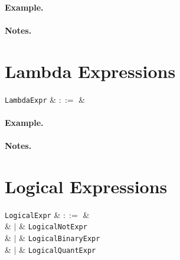 \paragraph{Example.}

\paragraph{Notes.}


\section{Lambda Expressions}
\label{c_expr_lambda}

\begin{syntax}
  \verb+LambdaExpr+ & $::=$ &\\
\end{syntax}

\paragraph{Example.}

\paragraph{Notes.}


\section{Logical Expressions}
\label{c_expr_logical}

\begin{syntax}
  \verb+LogicalExpr+ & $::=$ &\\
  & $|$ & \verb+LogicalNotExpr+\\
  & $|$ & \verb+LogicalBinaryExpr+\\
  & $|$ & \verb+LogicalQuantExpr+\\
\end{syntax}




